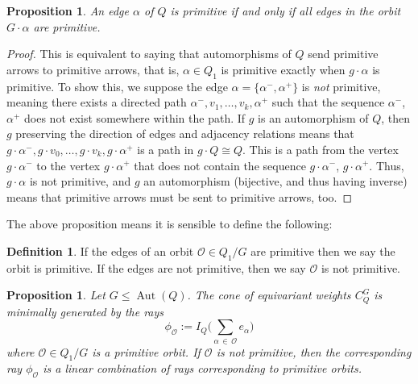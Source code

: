 \documentclass[12pt]{amsart}
\theoremstyle{plain}
\newtheorem{proposition}[theorem]{Proposition}
\theoremstyle{definition}
\newtheorem{definition}[theorem]{Definition}
\DeclareMathOperator{\aut}{Aut}
\begin{document}
\begin{proposition}
    An edge $\alpha$ of $Q$ is primitive if and only if all edges in the orbit $G \cdot \alpha$ are primitive.
\end{proposition}

\begin{proof}
    This is equivalent to saying that automorphisms of $Q$ send primitive arrows to primitive arrows, that is, $\alpha \in Q_1$ is primitive exactly when $g \cdot \alpha$ is primitive. To show this, we suppose the edge $\alpha = \{\alpha^-, \alpha^+\}$ is \textit{not} primitive, meaning there exists a directed path $\alpha^-, v_1, \ldots, v_k, \alpha^+$ such that the sequence $\alpha^-$, $\alpha^+$ does not exist somewhere within the path. If $g$ is an automorphism of $Q$, then $g$ preserving the direction of edges and adjacency relations means that $g \cdot \alpha^-, g \cdot v_0, \ldots, g \cdot v_k, g \cdot \alpha^+$ is a path in $g \cdot Q \cong Q$. This is a path from the vertex $g \cdot \alpha^-$ to the vertex $g \cdot \alpha^+$ that does not contain the sequence $g \cdot \alpha^-$, $g \cdot \alpha^+$. Thus, $g \cdot \alpha$ is not primitive, and $g$ an automorphism (bijective, and thus having inverse) means that primitive arrows must be sent to primitive arrows, too.
\end{proof}

The above proposition means it is sensible to define the following:

\begin{definition}
    If the edges of an orbit $\mathcal{O} \in Q_1 / G$ are primitive then we say the orbit is primitive. If the edges are not primitive, then we say $\mathcal{O}$ is not primitive.
\end{definition}

\begin{proposition} \label{equivariant-cone-generators}
    Let $G \leq \aut(Q)$. The cone of equivariant weights $C_Q^G$ is minimally generated by the rays 
\[
\phi_\mathcal{O} := I_Q\Big(\sum_{\alpha \,\in \,\mathcal{O}}e_\alpha\Big) 
\]
    where $\mathcal{O} \in Q_1 / G$ is a primitive orbit. If $\mathcal{O}$ is not primitive, then the corresponding ray $\phi_\mathcal{O}$ is a linear combination of rays corresponding to primitive orbits.
\end{proposition}
\end{document}
